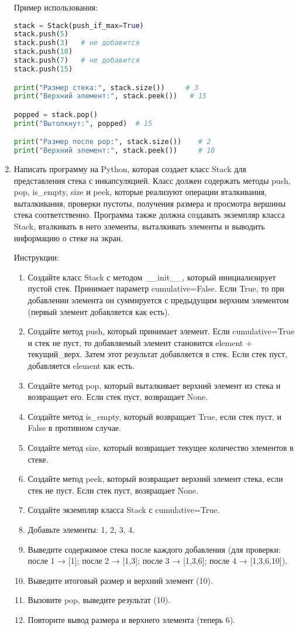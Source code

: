 \begin{enumerate}
Пример использования:
\begin{lstlisting}[language=Python]
stack = Stack(push_if_max=True)
stack.push(5)
stack.push(3)   # не добавится
stack.push(10)
stack.push(7)   # не добавится
stack.push(15)

print("Размер стека:", stack.size())     # 3
print("Верхний элемент:", stack.peek())   # 15

popped = stack.pop()
print("Вытолкнут:", popped)  # 15

print("Размер после pop:", stack.size())    # 2
print("Верхний элемент:", stack.peek())     # 10
\end{lstlisting}

\item Написать программу на Python, которая создает класс Stack для представления стека с инкапсуляцией. Класс должен содержать методы push, pop, is\_empty, size и peek, которые реализуют операции вталкивания, выталкивания, проверки пустоты, получения размера и просмотра вершины стека соответственно. Программа также должна создавать экземпляр класса Stack, вталкивать в него элементы, выталкивать элементы и выводить информацию о стеке на экран.

Инструкции:
\begin{enumerate}
    \item Создайте класс Stack с методом \_\_init\_\_, который инициализирует пустой стек. Принимает параметр cumulative=False. Если True, то при добавлении элемента он суммируется с предыдущим верхним элементом (первый элемент добавляется как есть).
    \item Создайте метод push, который принимает элемент. Если cumulative=True и стек не пуст, то добавляемый элемент становится element + текущий\_верх. Затем этот результат добавляется в стек. Если стек пуст, добавляется element как есть.
    \item Создайте метод pop, который выталкивает верхний элемент из стека и возвращает его. Если стек пуст, возвращает None.
    \item Создайте метод is\_empty, который возвращает True, если стек пуст, и False в противном случае.
    \item Создайте метод size, который возвращает текущее количество элементов в стеке.
    \item Создайте метод peek, который возвращает верхний элемент стека, если стек не пуст. Если стек пуст, возвращает None.
    \item Создайте экземпляр класса Stack с cumulative=True.
    \item Добавьте элементы: 1, 2, 3, 4.
    \item Выведите содержимое стека после каждого добавления (для проверки: после 1 → [1]; после 2 → [1,3]; после 3 → [1,3,6]; после 4 → [1,3,6,10]).
    \item Выведите итоговый размер и верхний элемент (10).
    \item Вызовите pop, выведите результат (10).
    \item Повторите вывод размера и верхнего элемента (теперь 6).
\end{enumerate}


\end{enumerate}
